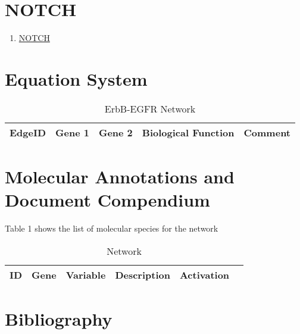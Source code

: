 
\section{NOTCH}

\begin{enumerate}
\item \href{https://www.genome.jp/kegg-bin/show_pathway?map=hsa04012&show_description=show}{NOTCH}
\end{enumerate}

\section{Equation System}


\begin{table}[H]
	\tiny
	\begin{tabular}{p{1cm}p{1cm}p{3cm}p{1cm}p{1cm}} 
		EdgeID & Gene 1 & Gene 2 & Biological Function & Comment \\
		\hline
    
    \end{tabular}
	\caption{ErbB-EGFR Network}
	\label{tab:Table2}
\end{table}


\section{Molecular Annotations and Document Compendium}

Table 1 shows the list of molecular species for the network
\vspace{8pt}
\begin{table}[H]
	\begin{tabular}{rlllll}
		\hline
		ID & Gene & Variable & Description & Activation \\ 
		\hline

		\hline
	\end{tabular}
	\caption{Network}
	\label{tab:Table2}
\end{table}

\section{Bibliography}

